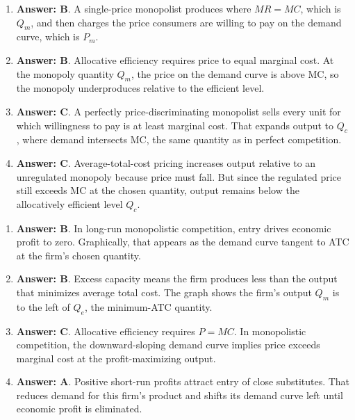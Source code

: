 \documentclass[10pt]{article}
\begin{document}
\begin{enumerate}[resume*=curves, leftmargin=*, itemsep=0.58em, topsep=0.18em, parsep=0pt]
\item \textbf{Answer: B}. A single-price monopolist produces where $MR=MC$, which is $Q_m$, and then charges the price consumers are willing to pay on the demand curve, which is $P_m$.
\item \textbf{Answer: B}. Allocative efficiency requires price to equal marginal cost. At the monopoly quantity $Q_m$, the price on the demand curve is above MC, so the monopoly underproduces relative to the efficient level.
\item \textbf{Answer: C}. A perfectly price-discriminating monopolist sells every unit for which willingness to pay is at least marginal cost. That expands output to $Q_c$, where demand intersects MC, the same quantity as in perfect competition.
\item \textbf{Answer: C}. Average-total-cost pricing increases output relative to an unregulated monopoly because price must fall. But since the regulated price still exceeds MC at the chosen quantity, output remains below the allocatively efficient level $Q_c$.
\end{enumerate}
\begin{enumerate}[resume*=curves, leftmargin=*, itemsep=0.58em, topsep=0.18em, parsep=0pt]
\item \textbf{Answer: B}. In long-run monopolistic competition, entry drives economic profit to zero. Graphically, that appears as the demand curve tangent to ATC at the firm's chosen quantity.
\item \textbf{Answer: B}. Excess capacity means the firm produces less than the output that minimizes average total cost. The graph shows the firm's output $Q_m$ is to the left of $Q_e$, the minimum-ATC quantity.
\item \textbf{Answer: C}. Allocative efficiency requires $P=MC$. In monopolistic competition, the downward-sloping demand curve implies price exceeds marginal cost at the profit-maximizing output.
\item \textbf{Answer: A}. Positive short-run profits attract entry of close substitutes. That reduces demand for this firm's product and shifts its demand curve left until economic profit is eliminated.
\end{enumerate}
\end{document}
